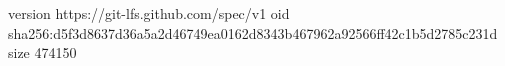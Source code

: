 version https://git-lfs.github.com/spec/v1
oid sha256:d5f3d8637d36a5a2d46749ea0162d8343b467962a92566ff42c1b5d2785c231d
size 474150
